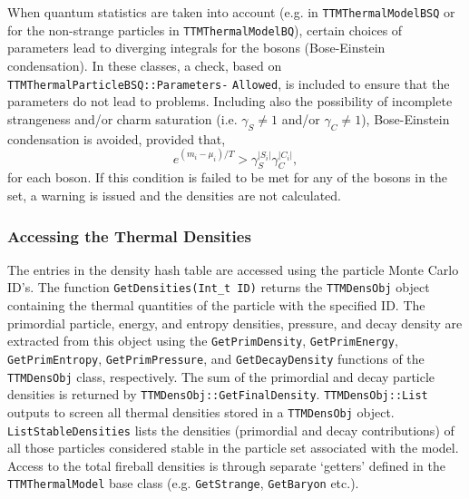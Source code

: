 \documentclass{elsarticle}
\begin{document}
When quantum statistics are taken into account (e.g. in \texttt{TTMThermalModelBSQ} or 
for the non-strange particles in \texttt{TTMThermalModelBQ}), certain choices of 
parameters lead to diverging 
integrals for the bosons (Bose-Einstein condensation). 
In these classes, a check, based on 
\texttt{TTMThermalParticleBSQ::Parameters-} \texttt{Allowed}, is included to ensure that the parameters 
do not lead to problems. Including also the possibility of incomplete strangeness and/or charm 
saturation (i.e. $\gamma_S\neq1$ and/or $\gamma_C\neq1$), Bose-Einstein condensation is avoided, 
provided that,
\begin{equation}
e^{\left(m_i-\mu_i\right)/T} > \gamma_S^{\left|S_i\right|}\gamma_C^{\left|C_i\right|},
\end{equation}
for each boson. If this condition is failed to be met for any of the bosons in the set, a 
warning is issued and the densities are not calculated.\\


\subsubsection{Accessing the Thermal Densities}

The entries in the density hash table are accessed using the particle Monte Carlo ID's. The function 
\texttt{GetDensities(Int\_t ID)} returns the \texttt{TTMDensObj} object containing the thermal quantities 
of the particle 
with the specified ID. The primordial particle, energy, and entropy densities, pressure, and decay density 
are extracted from this object using the \texttt{GetPrimDensity}, \texttt{GetPrimEnergy}, 
\texttt{GetPrimEntropy}, \texttt{GetPrimPressure}, and \texttt{GetDecayDensity} functions of the \texttt{TTMDensObj} class, respectively. 
The sum of the primordial and decay particle 
densities is returned by \texttt{TTMDensObj::GetFinalDensity}. \texttt{TTMDensObj::List} outputs to 
screen all thermal densities 
stored in a\linebreak
\texttt{TTMDensObj} object.\\
 
\texttt{ListStableDensities} lists the densities (primordial and decay contributions) of all those particles 
considered stable in the particle set associated with the model. Access to the total fireball densities is through separate `getters' defined in the \texttt{TTMThermalModel} 
base class (e.g. \texttt{GetStrange}, \texttt{GetBaryon} etc.).\\ 
\end{document}
